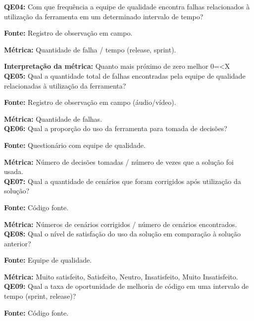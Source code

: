 \textbf{QE04: } Com que frequência a equipe de qualidade encontra falhas relacionados à utilização da ferramenta em um determinado intervalo de tempo?

\textbf{Fonte:} Registro de observação em campo.

\textbf{Métrica:} Quantidade de falha / tempo (release, sprint).

\textbf{Interpretação da métrica:} Quanto mais próximo de zero melhor 0=<X\\



\textbf{QE05: } Qual a quantidade total de falhas encontradas pela equipe de qualidade relacionadas à utilização da ferramenta?

\textbf{Fonte:} Registro de observação em campo (áudio/vídeo).

\textbf{Métrica:} Quantidade de falhas.\\



\textbf{QE06: } Qual a proporção do uso da ferramenta para tomada de decisões?

\textbf{Fonte:} Questionário com equipe de qualidade.

\textbf{Métrica:} Número de decisões tomadas / número de vezes que a solução foi usada.\\




\textbf{QE07: } Qual a quantidade de cenários que foram corrigidos após utilização da solução?

\textbf{Fonte:} Código fonte.

\textbf{Métrica:} Números de cenários corrigidos / número de cenários encontrados.\\



\textbf{QE08: } Qual o nível de satisfação do uso da solução em comparação à solução anterior? 

\textbf{Fonte:} Equipe de qualidade.

\textbf{Métrica:} Muito satisfeito, Satisfeito, Neutro, Insatisfeito, Muito Insatisfeito.\\



\textbf{QE09: } Qual a taxa de oportunidade de melhoria de código em uma intervalo de tempo (sprint, release)? 

\textbf{Fonte:} Código fonte.

